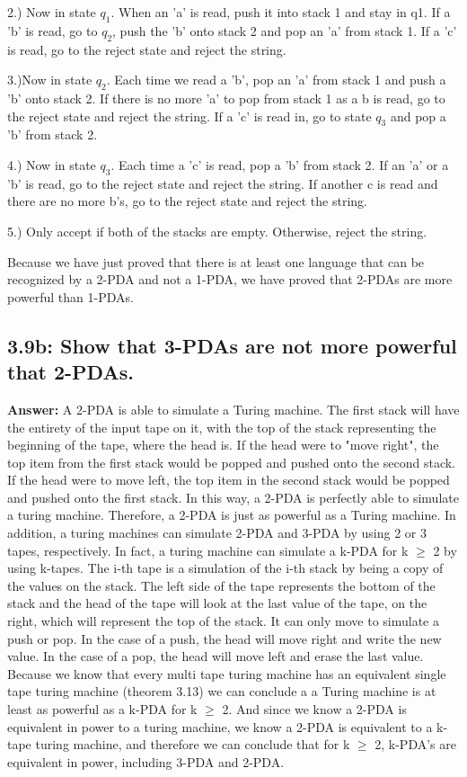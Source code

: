 \documentclass[12pt]{article}
\begin{document}
2.) Now in state $q_1$. When an 'a' is read, push it into stack 1 and stay in q1. If a 'b' is read, go to $q_2$, push the 'b' onto stack 2 and pop an 'a' from stack 1. If a 'c' is read, go to the reject state and reject the string.

3.)Now in state $q_2$. Each time we read a 'b', pop an 'a' from stack 1 and push a 'b' onto stack 2. If there is no more 'a' to pop from stack 1 as a b is read, go to the reject state and reject the string. If a 'c' is read in, go to state $q_3$ and pop a 'b' from stack 2.

4.) Now in state $q_3$. Each time a 'c' is read, pop a 'b' from stack 2. If an 'a' or a 'b' is read, go to the reject state and reject the string. If another c is read and there are no more b's, go to the reject state and reject the string.

5.) Only accept if both of the stacks are empty. Otherwise, reject the string.

Because we have just proved that there is at least one language that can be recognized by a 2-PDA and not a 1-PDA, we have proved that 2-PDAs are more powerful than 1-PDAs.

\subsection*{3.9b: Show that 3-PDAs are not more powerful that 2-PDAs.}
{\bfseries Answer:} A 2-PDA is able to simulate a Turing machine. The first stack will have the entirety of the input tape on it, with the top of the stack representing the beginning of the tape, where the head is. If the head were to "move right", the top item from the first stack would be popped and pushed onto the second stack. If the head were to move left, the top item in the second stack would be popped and pushed onto the first stack. In this way, a 2-PDA is perfectly able to simulate a turing machine. Therefore, a 2-PDA is just as powerful as a Turing machine. In addition, a turing machines can simulate 2-PDA and 3-PDA by using 2 or 3 tapes, respectively. In fact, a turing machine can simulate a k-PDA for k $\geq$ 2 by using k-tapes. The i-th tape is a simulation of the i-th stack by being a copy of the values on the stack. The left side of the tape represents the bottom of the stack and the head of the tape will look at the last value of the tape, on the right, which will represent the top of the stack. It can only move to simulate a push or pop. In the case of a push, the head will move right and write the new value. In the case of a pop, the head will move left and erase the last value. Because we know that every multi tape turing machine has an equivalent single tape turing machine (theorem 3.13) we can conclude a a Turing machine is at least as powerful as a k-PDA for k $\geq$ 2. And since we know a 2-PDA is equivalent in power to a turing machine, we know a 2-PDA is equivalent to a k-tape turing machine, and therefore we can conclude that for k $\geq$ 2, k-PDA's are equivalent in power, including 3-PDA and 2-PDA.
\end{document}
